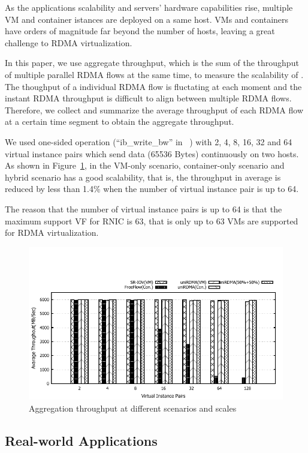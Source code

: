 As the applications scalability and servers' hardware capabilities rise, multiple VM and container istances are deployed on a same host. VMs and containers have orders of magnitude far beyond the number of hosts, leaving a great challenge to RDMA virtualization. 

In this paper, we use aggregate throughput, which is the sum of the throughput of multiple parallel RDMA flows at the same time, to measure the scalability of \sys. The thoughput of a individual RDMA flow is fluctating at each moment and the instant RDMA throughput is difficult to align between multiple RDMA flows. Therefore, we collect and summarize the average throughput of each RDMA flow at a certain time segment to obtain the aggregate throughput.

We used one-sided operation (``ib\_write\_bw'' in ~\cite{perftest}) with 2, 4, 8, 16, 32 and 64 virtual instance pairs which send data (65536 Bytes) continuously on two hosts. As shown in Figure~\ref{fig:scabality}, in the VM-only scenario, container-only scenario and hybrid scenario \sys has a good scalability, that is, the throughput in average is reduced by less than 1.4\% when the number of virtual instance pair is up to 64.

The reason that the number of virtual instance pairs is up to 64 is that the maximum support VF for RNIC is 63, that is only up to 63 VMs are supported for RDMA virtualization.

\begin{figure}[!ht]
	\centering
	\includegraphics[width=1.0\linewidth]{images/scabality.pdf}
	\caption{Aggregation throughput at different scenarios and scales}
	\label{fig:scabality}
\end{figure}

\subsection{Real-world Applications}


